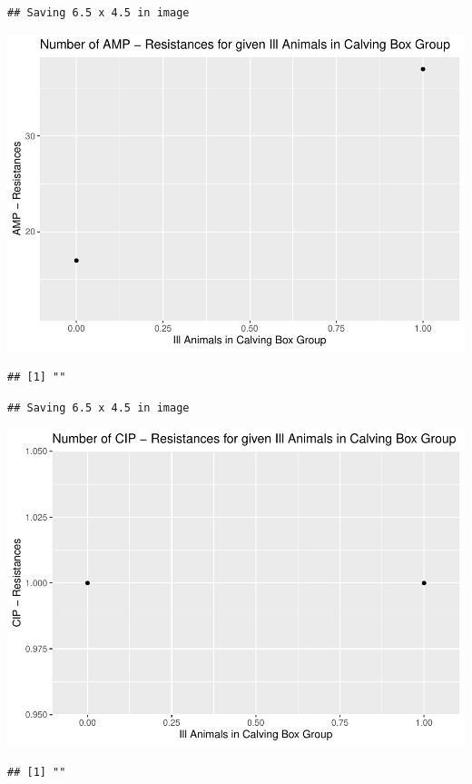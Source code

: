 \documentclass[
]{article}
\begin{document}
\begin{verbatim}
## Saving 6.5 x 4.5 in image
\end{verbatim}

\includegraphics{NResistenzen_files/figure-latex/binary_or_nominal_variables-21.pdf}

\begin{verbatim}
## [1] ""
\end{verbatim}

\begin{verbatim}
## Saving 6.5 x 4.5 in image
\end{verbatim}

\includegraphics{NResistenzen_files/figure-latex/binary_or_nominal_variables-22.pdf}

\begin{verbatim}
## [1] ""
\end{verbatim}
\end{document}

